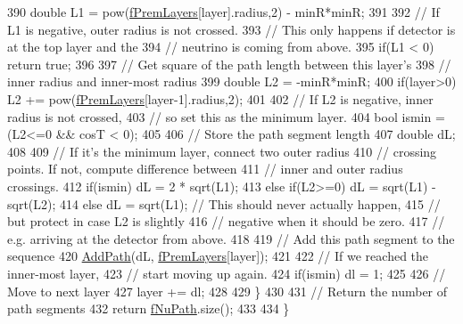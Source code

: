\begin{DoxyCode}
390     \textcolor{keywordtype}{double} L1 = pow(\hyperlink{classOscProb_1_1PremModel_a19a9a3b23ec154ad7a29f92b74aa5bc6}{fPremLayers}[layer].radius,2) - minR*minR;
391 
392     \textcolor{comment}{// If L1 is negative, outer radius is not crossed.}
393     \textcolor{comment}{// This only happens if detector is at the top layer and the}
394     \textcolor{comment}{// neutrino is coming from above.}
395     \textcolor{keywordflow}{if}(L1 < 0) \textcolor{keywordflow}{return} \textcolor{keyword}{true};
396 
397     \textcolor{comment}{// Get square of the path length between this layer's}
398     \textcolor{comment}{// inner radius and  inner-most radius}
399     \textcolor{keywordtype}{double} L2 = -minR*minR;
400     \textcolor{keywordflow}{if}(layer>0) L2 += pow(\hyperlink{classOscProb_1_1PremModel_a19a9a3b23ec154ad7a29f92b74aa5bc6}{fPremLayers}[layer-1].radius,2);
401 
402     \textcolor{comment}{// If L2 is negative, inner radius is not crossed,}
403     \textcolor{comment}{// so set this as the minimum layer.}
404     \textcolor{keywordtype}{bool} ismin = (L2<=0 && cosT < 0);
405 
406     \textcolor{comment}{// Store the path segment length}
407     \textcolor{keywordtype}{double} dL;
408 
409     \textcolor{comment}{// If it's the minimum layer, connect two outer radius}
410     \textcolor{comment}{// crossing points. If not, compute difference between}
411     \textcolor{comment}{// inner and outer radius crossings.}
412     \textcolor{keywordflow}{if}(ismin)      dL = 2 * sqrt(L1);
413     \textcolor{keywordflow}{else} \textcolor{keywordflow}{if}(L2>=0) dL = sqrt(L1) - sqrt(L2);
414     \textcolor{keywordflow}{else}           dL = sqrt(L1); \textcolor{comment}{// This should never actually happen,}
415                                   \textcolor{comment}{// but protect in case L2 is slightly}
416                                   \textcolor{comment}{// negative when it should be zero.}
417                                   \textcolor{comment}{// e.g. arriving at the detector from above.}
418 
419     \textcolor{comment}{// Add this path segment to the sequence}
420     \hyperlink{classOscProb_1_1PremModel_aca013f7ac5494282834048786a0e07a6}{AddPath}(dL, \hyperlink{classOscProb_1_1PremModel_a19a9a3b23ec154ad7a29f92b74aa5bc6}{fPremLayers}[layer]);
421 
422     \textcolor{comment}{// If we reached the inner-most layer,}
423     \textcolor{comment}{// start moving up again.}
424     \textcolor{keywordflow}{if}(ismin) dl = 1;
425 
426     \textcolor{comment}{// Move to next layer}
427     layer += dl;
428 
429   \}
430 
431   \textcolor{comment}{// Return the number of path segments}
432   \textcolor{keywordflow}{return} \hyperlink{classOscProb_1_1PremModel_aaf3c77e35798d664853157013c90ad2b}{fNuPath}.size();
433 
434 \}
\end{DoxyCode}
\mbox{\label{classOscProb_1_1PremModel_a5328474bdbb703eb4c9d4df49999cda6}} 
